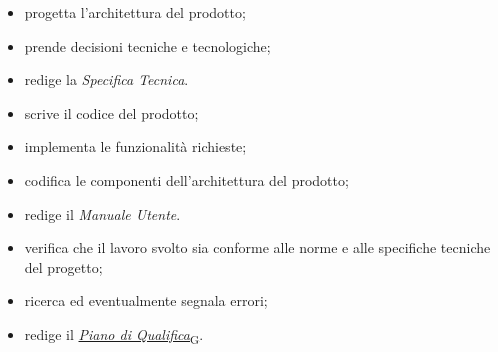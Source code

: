 \begin{itemize}
    \item progetta l'architettura del prodotto;
    \item prende decisioni tecniche e tecnologiche;
    \item redige la \textit{Specifica Tecnica}.
\end{itemize}

\begin{itemize}
    \item scrive il codice del prodotto;
    \item implementa le funzionalità richieste;
    \item codifica le componenti dell'architettura del prodotto;
    \item redige il \textit{Manuale Utente}. 
\end{itemize}

\begin{itemize}
    \item verifica che il lavoro svolto sia conforme alle norme e alle specifiche tecniche del progetto;
    \item ricerca ed eventualmente segnala errori;
    \item redige il \href{https://7last.github.io/docs/rtb/documentazione-interna/glossario\#piano-di-qualifica}{\textit{Piano di Qualifica}\textsubscript{G}}.
\end{itemize}

